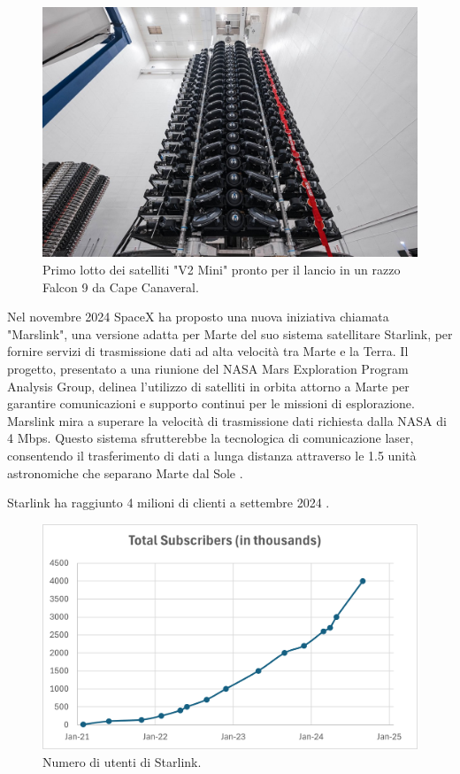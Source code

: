 \begin{figure}[htbp]
  \centering
  \includegraphics[width=0.8\linewidth]{./res/img/satellite_v2mini.jpg}
  \caption{Primo lotto dei satelliti "V2 Mini" pronto per il lancio in un razzo Falcon 9 da Cape Canaveral.}
  \label{fig:satellite_v2mini}
\end{figure}

Nel novembre 2024 SpaceX ha proposto una nuova iniziativa chiamata "Marslink", una versione adatta per Marte del suo sistema satellitare Starlink, per fornire servizi di trasmissione dati ad alta velocità tra Marte e la Terra. 
Il progetto, presentato a una riunione del NASA Mars Exploration Program Analysis Group, delinea l'utilizzo di satelliti in orbita attorno a Marte per garantire comunicazioni e supporto continui per le missioni di esplorazione.
Marslink mira a superare la velocità di trasmissione dati richiesta dalla NASA di 4 Mbps.
Questo sistema sfrutterebbe la tecnologica di comunicazione laser, consentendo il trasferimento di dati a lunga distanza attraverso le 1.5 unità astronomiche che separano Marte dal Sole \cite{michael_kan_spacex_2024}.

Starlink ha raggiunto 4 milioni di clienti a settembre 2024 \cite{starlink_starlink_nodate}.

\begin{figure}[htbp]
  \centering
  \includegraphics[width=0.8\linewidth]{./res/img/chart_subs.png}
  \caption{Numero di utenti di Starlink.}
  \label{fig:chart-subs}
\end{figure}

